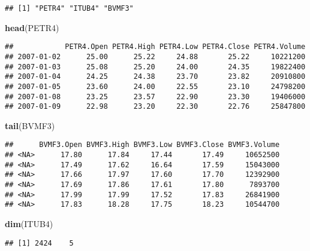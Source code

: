 \documentclass[]{article}
\newenvironment{Shaded}{\begin{snugshade}}{\end{snugshade}}
\newcommand{\KeywordTok}[1]{\textcolor[rgb]{0.13,0.29,0.53}{\textbf{{#1}}}}
\newcommand{\NormalTok}[1]{{#1}}
\begin{document}
\begin{verbatim}
## [1] "PETR4" "ITUB4" "BVMF3"
\end{verbatim}

\begin{Shaded}
\begin{Highlighting}[]
\KeywordTok{head}\NormalTok{(PETR4)}
\end{Highlighting}
\end{Shaded}

\begin{verbatim}
##            PETR4.Open PETR4.High PETR4.Low PETR4.Close PETR4.Volume
## 2007-01-02      25.00      25.22     24.88       25.22     10221200
## 2007-01-03      25.08      25.20     24.00       24.35     19822400
## 2007-01-04      24.25      24.38     23.70       23.82     20910800
## 2007-01-05      23.60      24.00     22.55       23.10     24798200
## 2007-01-08      23.25      23.57     22.90       23.30     19406000
## 2007-01-09      22.98      23.20     22.30       22.76     25847800
\end{verbatim}

\begin{Shaded}
\begin{Highlighting}[]
\KeywordTok{tail}\NormalTok{(BVMF3)}
\end{Highlighting}
\end{Shaded}

\begin{verbatim}
##      BVMF3.Open BVMF3.High BVMF3.Low BVMF3.Close BVMF3.Volume
## <NA>      17.80      17.84     17.44       17.49     10652500
## <NA>      17.49      17.62     16.64       17.59     15043000
## <NA>      17.66      17.97     17.60       17.70     12392900
## <NA>      17.69      17.86     17.61       17.80      7893700
## <NA>      17.99      17.99     17.52       17.83     26841900
## <NA>      17.83      18.28     17.75       18.23     10544700
\end{verbatim}

\begin{Shaded}
\begin{Highlighting}[]
\KeywordTok{dim}\NormalTok{(ITUB4)}
\end{Highlighting}
\end{Shaded}

\begin{verbatim}
## [1] 2424    5
\end{verbatim}
\end{document}
